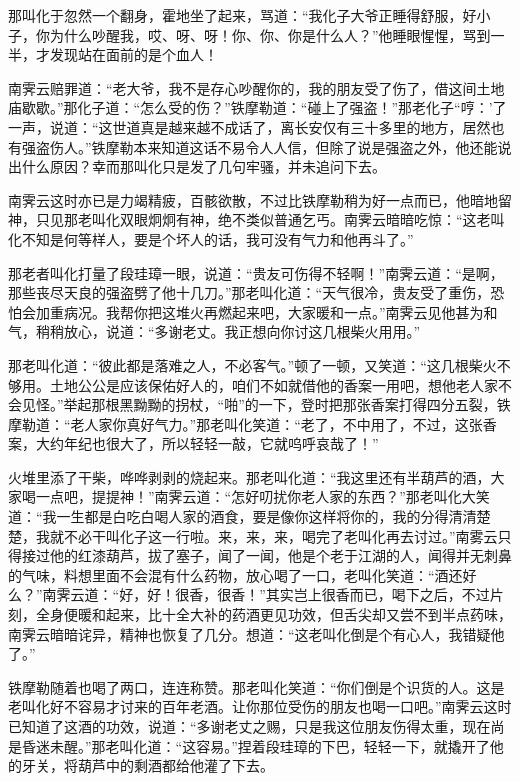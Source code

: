 \documentclass[12pt,oneside]{book}
\begin{document}
那叫化于忽然一个翻身，霍地坐了起来，骂道：``我化子大爷正睡得舒服，好小子，你为什么吵醒我，哎、呀、呀！你、你、你是什么人？''他睡眼惺惺，骂到一半，才发现站在面前的是个血人！

南霁云赔罪道：``老大爷，我不是存心吵醒你的，我的朋友受了伤了，借这间土地庙歇歇。''那化子道：``怎么受的伤？''铁摩勒道：``碰上了强盗！''那老化子``哼：'了一声，说道：``这世道真是越来越不成话了，离长安仅有三十多里的地方，居然也有强盗伤人。''铁摩勒本来知道这话不易令人人信，但除了说是强盗之外，他还能说出什么原因？幸而那叫化只是发了几句牢骚，并未追问下去。

南霁云这时亦已是力竭精疲，百骸欲散，不过比铁摩勒稍为好一点而已，他暗地留神，只见那老叫化双眼炯炯有神，绝不类似普通乞丐。南霁云暗暗吃惊：``这老叫化不知是何等样人，要是个坏人的话，我可没有气力和他再斗了。''

那老者叫化打量了段珪璋一眼，说道：``贵友可伤得不轻啊！''南霁云道：``是啊，那些丧尽天良的强盗劈了他十几刀。''那老叫化道：``天气很冷，贵友受了重伤，恐怕会加重病况。我帮你把这堆火再燃起来吧，大家暖和一点。''南霁云见他甚为和气，稍稍放心，说道：``多谢老丈。我正想向你讨这几根柴火用用。''

那老叫化道：``彼此都是落难之人，不必客气。''顿了一顿，又笑道：``这几根柴火不够用。土地公公是应该保佑好人的，咱们不如就借他的香案一用吧，想他老人家不会见怪。''举起那根黑黝黝的拐杖，``啪''的一下，登时把那张香案打得四分五裂，铁摩勒道：``老人家你真好气力。''那老叫化笑道：``老了，不中用了，不过，这张香案，大约年纪也很大了，所以轻轻一敲，它就呜呼哀哉了！''

火堆里添了干柴，哗哗剥剥的烧起来。那老叫化道：``我这里还有半葫芦的酒，大家喝一点吧，提提神！''南霁云道：``怎好叨扰你老人家的东西？''那老叫化大笑道：``我一生都是白吃白喝人家的酒食，要是像你这样将你的，我的分得清清楚楚，我就不必干叫化子这一行啦。来，来，来，喝完了老叫化再去讨过。''南雾云只得接过他的红漆葫芦，拔了塞子，闻了一闻，他是个老于江湖的人，闻得并无刺鼻的气味，料想里面不会混有什么药物，放心喝了一口，老叫化笑道：``酒还好么？''南霁云道：``好，好！很香，很香！''其实岂上很香而已，喝下之后，不过片刻，全身便暖和起来，比十全大补的药酒更见功效，但舌尖却又尝不到半点药味，南霁云暗暗诧异，精神也恢复了几分。想道：``这老叫化倒是个有心人，我错疑他了。''

铁摩勒随着也喝了两口，连连称赞。那老叫化笑道：``你们倒是个识货的人。这是老叫化好不容易才讨来的百年老酒。让你那位受伤的朋友也喝一口吧。''南霁云这时已知道了这酒的功效，说道：``多谢老丈之赐，只是我这位朋友伤得太重，现在尚是昏迷未醒。''那老叫化道：``这容易。''捏着段珪璋的下巴，轻轻一下，就撬开了他的牙关，将葫芦中的剩酒都给他灌了下去。
\end{document}

